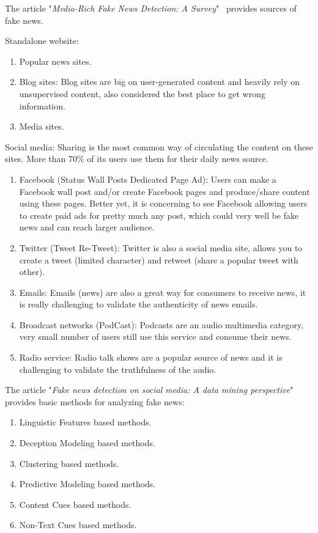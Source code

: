 The article "\textit{Media-Rich Fake News Detection: A Survey}"~\cite{3} provides sources of fake news.

Standalone website:
\begin{enumerate}
    \item Popular news sites.
    \item Blog sites: Blog sites are big on user-generated content and heavily rely on unsupervised content, also considered the best place to get wrong information.
    \item Media sites.
\end{enumerate}

Social media: Sharing is the most common way of circulating the content on these sites.
More than 70\% of its users use them for their daily news source.
\begin{enumerate}
    \item Facebook (Status \textemdash Wall Posts \textemdash Dedicated Page \textemdash Ad): Users can make a Facebook wall post and/or create Facebook pages and produce/share content using these pages.
    Better yet, it is concerning to see Facebook allowing users to create paid ads for pretty much any post, which could very well be fake news and can reach larger audience.
    \item Twitter (Tweet \textemdash Re-Tweet): Twitter is also a social media site, allows you to create a tweet (limited character) and retweet (share a popular tweet with other).
    \item Emails: Emails (news) are also a great way for consumers to receive news, it is really challenging to validate the authenticity of news emails.
    \item Broadcast networks (PodCast): Podcasts are an audio multimedia category, very small number of users still use this service and consume their news.
    \item Radio service: Radio talk shows are a popular source of news and it is challenging to validate the truthfulness of the audio.
\end{enumerate}

The article "\textit{Fake news detection on social media: A data mining perspective}"~\cite{9} provides basic methods for analyzing fake news:
\begin{enumerate}
    \item Linguistic Features based methods.
    \item Deception Modeling based methods.
    \item Clustering based methods.
    \item Predictive Modeling based methods.
    \item Content Cues based methods.
    \item Non-Text Cues based methods.
\end{enumerate}

